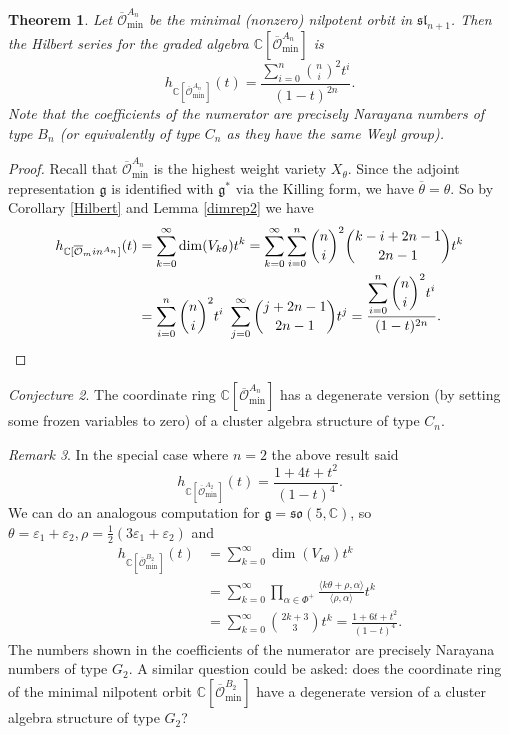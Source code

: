 \documentclass[12pt]{extarticle}
\theoremstyle{plain}
\newtheorem{theo}{Theorem}[section]
\theoremstyle{definition}
\theoremstyle{remark}
\newtheorem{rema}[theo]{Remark}
\newtheorem{conj}[theo]{Conjecture}
\newcommand{\Ominbar}{\overline{\mathcal{O}}_\textrm{min}}
\newcommand{\slnn}{\mathfrak{sl}_{n+1}}
\newcommand{\Lieg}{\mathfrak{g}}
\newcommand{\C}{\mathbb{C}}
\begin{document}
\begin{theo}\label{Omin}
Let $\Ominbar^{A_n}$ be the minimal (nonzero) nilpotent orbit in $\slnn$. Then the Hilbert series for the graded algebra $\C[\Ominbar^{A_n}]$ is
    $$
        h_{\C[\Ominbar^{A_n}]}(t)=\frac{\sum_{i=0}^{n}\binom{n}{i}^2t^i}{(1-t)^{2n}}.
    $$
Note that the coefficients of the numerator are precisely Narayana numbers of type $B_n$ (or equivalently of type $C_n$ as they have the same Weyl group).
\end{theo}
\begin{proof}
    Recall that $\Ominbar^{A_n}$ is the highest weight variety $X_{\theta}$. Since the adjoint representation $\Lieg$ is identified with $\Lieg^*$ via the Killing form, we have $\overline{\theta}=\theta$. So by Corollary \ref{Hilbert} and Lemma \ref{dimrep2} we have
    \begin{align*}
        h_{\C[\Ominbar^{A_n}]}(t)& =\sum_{k=0}^{\infty}\dim(V_{k\theta})t^k
        =\sum_{k=0}^{\infty}\sum_{i=0}^n\binom{n}{i}^2\binom{k-i+2n-1}{2n-1}t^k\\
        & =\sum_{i=0}^{n}\binom{n}{i}^2t^i\ \sum_{j=0}^{\infty}\binom{j+2n-1}{2n-1}t^{j}=\frac{\displaystyle\sum_{i=0}^{n}\binom{n}{i}^2t^i}{(1-t)^{2n}}.\qedhere
    \end{align*}
\end{proof}
\begin{conj}
The coordinate ring $\C[\Ominbar^{A_n}]$ has a degenerate version (by setting some frozen variables to zero) of a cluster algebra structure of type $C_n$.
\end{conj}
\begin{rema} 
    In the special case where $n=2$ the above result said
    $$
        h_{\C[\Ominbar^{A_2}]}(t)=\frac{1+4t+t^2}{(1-t)^4}.
    $$
    We can do an analogous computation for $\Lieg=\mathfrak{so}(5,\C)$, so $\theta=\varepsilon_1+\varepsilon_2, \rho=\frac{1}{2}(3\varepsilon_1+\varepsilon_2)$ and
    \begin{align*}
        h_{\C[\Ominbar^{B_2}]}(t)
        &=\sum_{k=0}^{\infty}\dim(V_{k\theta})t^k \\
        &=\sum_{k=0}^{\infty}\prod_{\alpha\in\Phi^+}\frac{\langle k\theta+\rho,\alpha\rangle}{\langle\rho,\alpha\rangle}t^k \\
        &=\sum_{k=0}^{\infty}\binom{2k+3}{3}t^k
        =\frac{1+6t+t^2}{(1-t)^4}.
    \end{align*}
The numbers shown in the coefficients of the numerator are precisely Narayana numbers of type $G_2$. A similar question could be asked: does the coordinate ring of the minimal nilpotent orbit $\C[\Ominbar^{B_2}]$ have a degenerate version of a cluster algebra structure of type $G_2$?
\end{rema}
\end{document}
